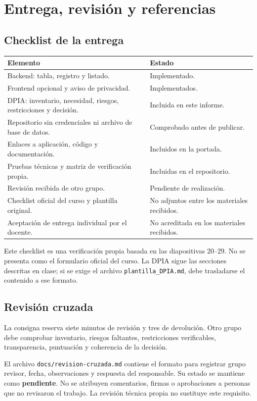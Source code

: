 \documentclass[11pt,a4paper]{article}
\begin{document}
\newpage
\section{Entrega, revisión y referencias}
\subsection{Checklist de la entrega}
{\small
\begin{tabularx}{\textwidth}{@{}YP{4cm}@{}}
\toprule
\textbf{Elemento} & \textbf{Estado}\\
\midrule
Backend: tabla, registro y listado. & Implementado.\\
Frontend opcional y aviso de privacidad. & Implementados.\\
DPIA: inventario, necesidad, riesgos, restricciones y decisión. & Incluida en este informe.\\
Repositorio sin credenciales ni archivo de base de datos. & Comprobado antes de publicar.\\
Enlaces a aplicación, código y documentación. & Incluidos en la portada.\\
Pruebas técnicas y matriz de verificación propia. & Incluidas en el repositorio.\\
Revisión recibida de otro grupo. & Pendiente de realización.\\
Checklist oficial del curso y plantilla original. & No adjuntos entre los materiales recibidos.\\
Aceptación de entrega individual por el docente. & No acreditada en los materiales recibidos.\\
\bottomrule
\end{tabularx}}

Este checklist es una verificación propia basada en las diapositivas 20--29. No se presenta como el formulario oficial del curso. La DPIA sigue las secciones descritas en clase; si se exige el archivo \texttt{plantilla\_DPIA.md}, debe trasladarse el contenido a ese formato.

\subsection{Revisión cruzada}
La consigna reserva siete minutos de revisión y tres de devolución. Otro grupo debe comprobar inventario, riesgos faltantes, restricciones verificables, transparencia, puntuación y coherencia de la decisión.

El archivo \texttt{docs/revision-cruzada.md} contiene el formato para registrar grupo revisor, fecha, observaciones y respuesta del responsable. Su estado se mantiene como \textbf{pendiente}. No se atribuyen comentarios, firmas o aprobaciones a personas que no revisaron el trabajo. La revisión técnica propia no sustituye este requisito.
\end{document}
